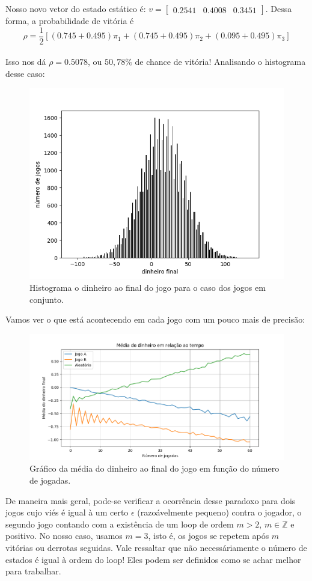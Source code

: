 \documentclass[12pt]{article}
\begin{document}
Nosso novo vetor do estado estático é: $v = \begin{bmatrix} 0.2541 & 0.4008 & 0.3451 \end{bmatrix}$. Dessa forma, a probabilidade de vitória é\\
$$
\rho = \frac{1}{2}[(0.745 + 0.495)\pi_1 + (0.745 + 0.495)\pi_2 + (0.095 + 0.495)\pi_3]
$$\\
Isso nos dá $\rho = 0.5078$, ou $50,78\%$ de chance de vitória! Analisando o histograma desse caso:


\begin{figure}[H]
\centering
\includegraphics[scale=0.65]{graph11.png}
\caption{Histograma o dinheiro ao final do jogo para o caso dos jogos em conjunto.}
\end{figure}

Vamos ver o que está acontecendo em cada jogo com um pouco mais de precisão:


\begin{figure}[H]
\centering
\includegraphics[scale=0.5]{graph12.png}
\caption{Gráfico da média do dinheiro ao final do jogo em função do número de jogadas.}
\end{figure}

De maneira mais geral, pode-se verificar a ocorrência desse paradoxo para dois jogos cujo viés é igual à um certo $\epsilon$ (razoávelmente pequeno) contra o jogador, o segundo jogo contando com a existência de um loop de ordem $m > 2$, $m \in \mathbb{Z}$ e positivo. No nosso caso, usamos $m = 3$, isto é, os jogos se repetem após $m$ vitórias ou derrotas seguidas. Vale ressaltar que não necessáriamente o número de estados é igual à ordem do loop! Eles podem ser definidos como se achar melhor para trabalhar.
\end{document}
